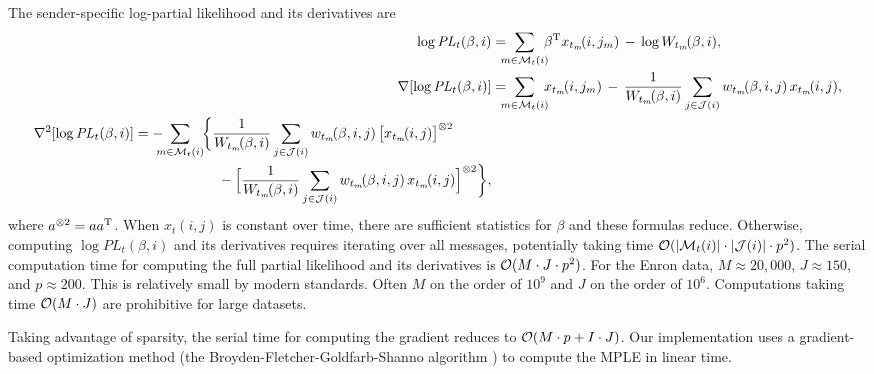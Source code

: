 \documentclass[aoas,preprint]{imsart}
\begin{document}
The sender-specific log-partial likelihood and its derivatives are
\begin{align*}
    \log \mathit{PL}_t(\beta, i)
        &=
        \!\!\!\!
        \sum_{m \in \mathcal{M}_t(i)}
            \!\!\!
            \beta^\trans
            x_{t_m}\!(i, j_m)
            \,
            -
            \,
            \log W_{t_m}\!(\beta, i), \\
    \nabla [ \log \mathit{PL}_t(\beta, i) ]
        &=
        \!\!\!\!
        \sum_{m \in \mathcal{M}_t(i)}
            \!\!\!
            x_{t_m}\!(i,j_m)
            \,
            -
            \,
            \frac{1}{W_{t_m}\!(\beta,i)}
                \sum_{j \in \mathcal{J}(i)}
                    w_{t_m}\!(\beta,i,j) \,
                    x_{t_m}\!(i,j), \\
    \begin{split}
    \nabla^2 [ \log \mathit{PL}_t(\beta, i) ]
        &=
        -
        \!\!\!\!
        \sum_{m \in \mathcal{M}_t(i)}
            \!\!
            \bigg\{
            \frac{1}{W_{t_m}\!(\beta,i)}
            \sum_{j \in \mathcal{J}(i)}
                w_{t_m}\!(\beta,i,j) \,
                \big[
                    x_{t_m}\!(i,j)
                \big]^{\otimes 2} \\
        &\qquad\qquad\qquad-
            \Big[
                \frac{1}{W_{t_m}\!(\beta,i)}
                \sum_{j \in \mathcal{J}(i)}
                    w_{t_m}\!(\beta,i,j) \,
                    x_{t_m}\!(i,j)
            \Big]^{\otimes 2}
            \bigg\},
    \end{split}
\end{align*}
where $a^{\otimes 2} = a a^{\mathrm{T}}$.  When $x_t(i,j)$ is constant over time,
there are sufficient statistics for $\beta$ and these formulas reduce.
Otherwise, computing $\log \mathit{PL}_t(\beta,i)$ and its derivatives
requires iterating over all messages, potentially taking time
$\mathcal{O}(|\mathcal{M}_t(i)| \cdot |\mathcal{J}(i)| \cdot p^2)$.
The serial computation time for computing the full partial likelihood
and its derivatives is $\mathcal{O}(M \cdot J \cdot p^2)$.
For the Enron data, $M \approx 20,\!000$, $J \approx 150$,
and $p \approx 200$.  This is relatively small by modern standards.  Often
$M$ on the order of $10^9$ and $J$ on the order of $10^6$.  Computations
taking time $\mathcal{O}(M \cdot J)$ are prohibitive for large datasets.

Taking advantage of sparsity, the serial time for computing the
gradient reduces to $\mathcal{O}(M \cdot p + I \cdot J)$.   Our implementation
uses a gradient-based optimization method (the
Broyden-Fletcher-Goldfarb-Shanno algorithm \cite{nocedal2006numerical}) to
compute the MPLE in linear time.
\end{document}
